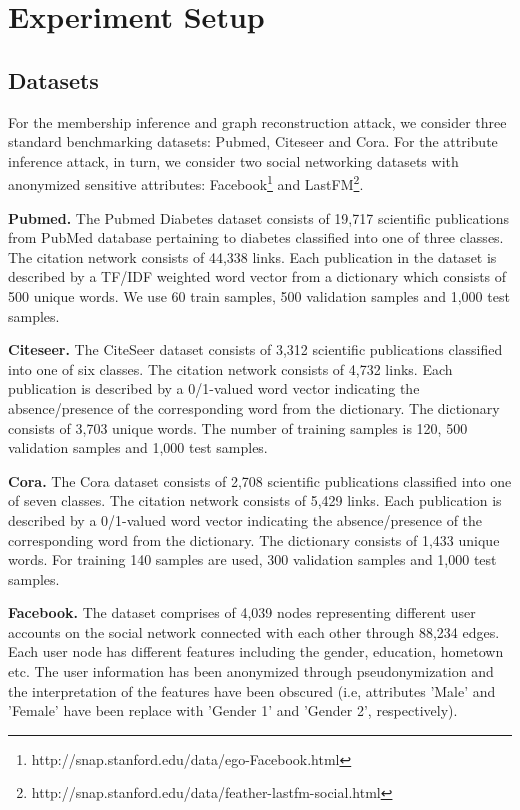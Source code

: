 \section{Experiment Setup}\label{setup}


\subsection{Datasets}

For the membership inference and graph reconstruction attack, we consider three standard benchmarking datasets: Pubmed, Citeseer and Cora.
For the attribute inference attack, in turn, we consider two social networking datasets with anonymized sensitive attributes: Facebook\footnote{http://snap.stanford.edu/data/ego-Facebook.html} and LastFM\footnote{http://snap.stanford.edu/data/feather-lastfm-social.html}.

\noindent\textbf{Pubmed.} The Pubmed Diabetes dataset consists of 19,717 scientific publications from PubMed database pertaining to diabetes classified into one of three classes. The citation network consists of 44,338 links. Each publication in the dataset is described by a TF/IDF weighted word vector from a dictionary which consists of 500 unique words.
We use 60 train samples, 500 validation samples and 1,000 test samples.

\noindent\textbf{Citeseer.} The CiteSeer dataset consists of 3,312 scientific publications classified into one of six classes.
The citation network consists of 4,732 links.
Each publication is described by a 0/1-valued word vector indicating the absence/presence of the corresponding word from the dictionary.
The dictionary consists of 3,703 unique words.
The number of training samples is 120, 500 validation samples and 1,000 test samples.

\noindent\textbf{Cora.} The Cora dataset consists of 2,708 scientific publications classified into one of seven classes.
The citation network consists of 5,429 links. Each publication is described by a 0/1-valued word vector indicating the absence/presence of the corresponding word from the dictionary.
The dictionary consists of 1,433 unique words.
For training 140 samples are used, 300 validation samples and 1,000 test samples.

\noindent\textbf{Facebook.} The dataset comprises of 4,039 nodes representing different user accounts on the social network connected with each other through 88,234 edges.
Each user node has different features including the gender, education, hometown etc.
The user information has been anonymized through pseudonymization and the interpretation of the features have been obscured (i.e, attributes 'Male' and 'Female' have been replace with 'Gender 1' and 'Gender 2', respectively).


